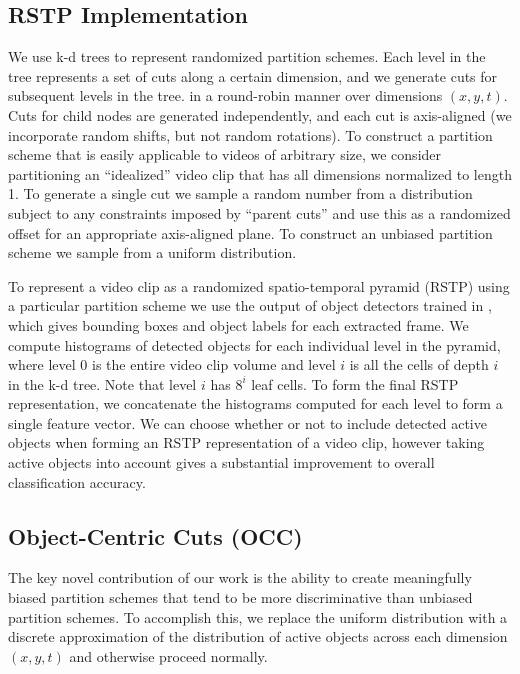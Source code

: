 \documentclass{bmvc2k}
\begin{document}
  \subsection{RSTP Implementation}
	We use k-d trees to represent randomized partition schemes. Each level in the tree
	represents a set of cuts along a certain dimension, and we generate cuts
  for subsequent levels in the tree.
  in a round-robin manner over dimensions $(x, y, t)$. Cuts for child nodes are generated independently, and each cut is axis-aligned
  (we incorporate random shifts, but not random rotations).
  To construct a partition scheme that is easily applicable to videos of
  arbitrary size, we consider
  partitioning an ``idealized'' video clip that has all dimensions normalized
  to length 1. To generate a single cut we sample a random number from a
  distribution subject to any constraints imposed by ``parent cuts'' and use
  this as a randomized offset for an appropriate axis-aligned plane. To
  construct an unbiased partition scheme we sample from a uniform
  distribution.
  
  To represent a video clip as a randomized spatio-temporal pyramid (RSTP)
  using a particular partition scheme we use the output of object detectors
  trained in \cite{Ramanan12}, which gives bounding boxes and object
  labels for each extracted frame. We compute histograms of detected
  objects for each individual level in the pyramid,
  where level 0 is the entire video clip volume and level $i$ is all the
  cells of depth $i$ in the k-d tree. 
  Note that level $i$ has $8^i$ leaf
  cells. To form the final RSTP representation, we concatenate the
  histograms computed for each level to form a single feature vector.
  We can choose whether or not to include detected active objects when
  forming an RSTP representation of a video clip, however taking active
  objects into account gives a substantial improvement to overall
  classification accuracy.
  
  \subsection{Object-Centric Cuts (OCC)}
  The key novel contribution of our work is the ability to create
  meaningfully biased partition schemes that tend to be more discriminative
  than unbiased partition schemes.
  To accomplish this, we replace the uniform distribution with a discrete
  approximation of the distribution of active objects across each dimension
  $(x, y, t)$
  and otherwise proceed normally.
\end{document}
